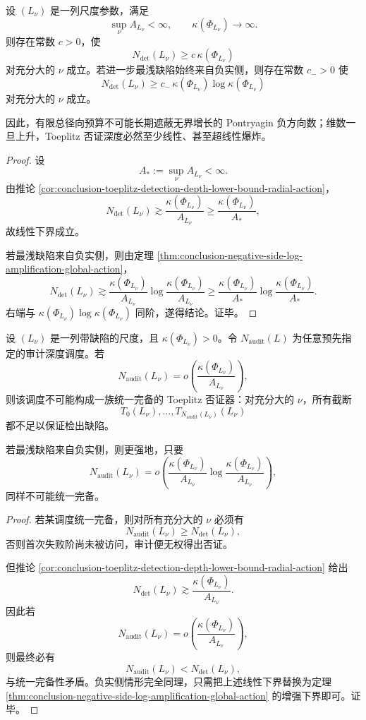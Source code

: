 \begin{corollary}[有限总作用量下缺陷维数增长强制证书深度爆炸]\label{cor:conclusion-bounded-radial-action-growing-kappa-depth-explosion}
设 \((L_\nu)\) 是一列尺度参数，满足
\[
\sup_\nu A_{L_\nu}<\infty,
\qquad
\kappa(\Phi_{L_\nu})\to\infty.
\]
则存在常数 \(c>0\)，使
\[
N_{\det}(L_\nu)\ge c\,\kappa(\Phi_{L_\nu})
\]
对充分大的 \(\nu\) 成立。若进一步最浅缺陷始终来自负实侧，则存在常数 \(c_->0\) 使
\[
N_{\det}(L_\nu)\ge c_-\,\kappa(\Phi_{L_\nu})\log \kappa(\Phi_{L_\nu})
\]
对充分大的 \(\nu\) 成立。

因此，有限总径向预算不可能长期遮蔽无界增长的 Pontryagin 负方向数；维数一旦上升，Toeplitz 否证深度必然至少线性、甚至超线性爆炸。
\end{corollary}
\begin{proof}
设
\[
A_*:=\sup_\nu A_{L_\nu}<\infty.
\]
由推论 \ref{cor:conclusion-toeplitz-detection-depth-lower-bound-radial-action}，
\[
N_{\det}(L_\nu)\gtrsim \frac{\kappa(\Phi_{L_\nu})}{A_{L_\nu}}
\ge
\frac{\kappa(\Phi_{L_\nu})}{A_*},
\]
故线性下界成立。

若最浅缺陷来自负实侧，则由定理 \ref{thm:conclusion-negative-side-log-amplification-global-action}，
\[
N_{\det}(L_\nu)
\gtrsim
\frac{\kappa(\Phi_{L_\nu})}{A_{L_\nu}}
\log\frac{\kappa(\Phi_{L_\nu})}{A_{L_\nu}}
\ge
\frac{\kappa(\Phi_{L_\nu})}{A_*}
\log\frac{\kappa(\Phi_{L_\nu})}{A_*}.
\]
右端与 \(\kappa(\Phi_{L_\nu})\log\kappa(\Phi_{L_\nu})\) 同阶，遂得结论。证毕。
\end{proof}

\begin{theorem}\label{thm:conclusion-sublinear-toeplitz-audit-impossible}
设 \((L_\nu)\) 是一列带缺陷的尺度，且 \(\kappa(\Phi_{L_\nu})>0\)。令 \(N_{\mathrm{audit}}(L)\) 为任意预先指定的审计深度调度。若
\[
N_{\mathrm{audit}}(L_\nu)=o\!\left(\frac{\kappa(\Phi_{L_\nu})}{A_{L_\nu}}\right),
\]
则该调度不可能构成一族统一完备的 Toeplitz 否证器：对充分大的 \(\nu\)，所有截断
\[
T_0(L_\nu),\dots,T_{N_{\mathrm{audit}}(L_\nu)}(L_\nu)
\]
都不足以保证检出缺陷。

若最浅缺陷来自负实侧，则更强地，只要
\[
N_{\mathrm{audit}}(L_\nu)=o\!\left(
\frac{\kappa(\Phi_{L_\nu})}{A_{L_\nu}}
\log\frac{\kappa(\Phi_{L_\nu})}{A_{L_\nu}}
\right),
\]
同样不可能统一完备。
\end{theorem}
\begin{proof}
若某调度统一完备，则对所有充分大的 \(\nu\) 必须有
\[
N_{\mathrm{audit}}(L_\nu)\ge N_{\det}(L_\nu),
\]
否则首次失败阶尚未被访问，审计便无权得出否证。

但推论 \ref{cor:conclusion-toeplitz-detection-depth-lower-bound-radial-action} 给出
\[
N_{\det}(L_\nu)\gtrsim \frac{\kappa(\Phi_{L_\nu})}{A_{L_\nu}}.
\]
因此若
\[
N_{\mathrm{audit}}(L_\nu)=o\!\left(\frac{\kappa(\Phi_{L_\nu})}{A_{L_\nu}}\right),
\]
则最终必有
\[
N_{\mathrm{audit}}(L_\nu)<N_{\det}(L_\nu),
\]
与统一完备性矛盾。负实侧情形完全同理，只需把上述线性下界替换为定理 \ref{thm:conclusion-negative-side-log-amplification-global-action} 的增强下界即可。证毕。
\end{proof}

